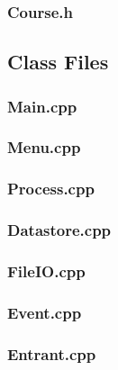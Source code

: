 \documentclass[a4paper, 10pt]{article}
\begin{document}
\clearpage
\subsubsection{Course.h}


\clearpage
\subsection{Class Files}

\subsubsection{Main.cpp}


\clearpage
\subsubsection{Menu.cpp}


\clearpage
\subsubsection{Process.cpp}


\clearpage
\subsubsection{Datastore.cpp}


\clearpage
\subsubsection{FileIO.cpp}


\clearpage
\subsubsection{Event.cpp}


\clearpage
\subsubsection{Entrant.cpp}

\end{document}
